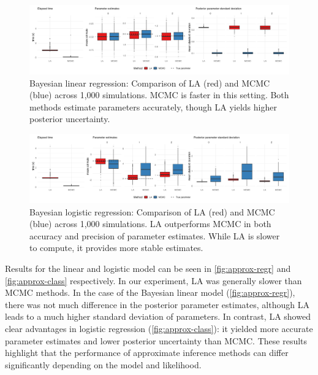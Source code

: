 \begin{figure}[htbp]
    \centering
    \includegraphics[width=\linewidth]{../figures/approx_regr.png}
    \caption{
    Bayesian linear regression: Comparison of LA (red) and MCMC (blue) across 1,000 simulations. MCMC is faster in this setting. Both methods estimate parameters accurately, though LA yields higher posterior uncertainty. 
    }
    \label{fig:approx-regr}
\end{figure}

\begin{figure}[htbp]
    \centering
    \includegraphics[width=\linewidth]{../figures/approx_class.png}
    \caption{
    Bayesian logistic regression: Comparison of LA (red) and MCMC (blue) across 1,000 simulations. LA outperforms MCMC in both accuracy and precision of parameter estimates. While LA is slower to compute, it provides more stable estimates.
    }
    \label{fig:approx-class}
\end{figure}

Results for the linear and logistic model can be seen in \autoref{fig:approx-regr} and \autoref{fig:approx-class} respectively.
In our experiment, LA was generally slower than MCMC methods.
In the case of the Bayesian linear model (\autoref{fig:approx-regr}), there was not much difference in the posterior parameter estimates, although LA leads to a much higher standard deviation of parameters.
In contrast, LA showed clear advantages in logistic regression (\autoref{fig:approx-class}): it yielded more accurate parameter estimates and lower posterior uncertainty than MCMC. These results highlight that the performance of approximate inference methods can differ significantly depending on the model and likelihood.


